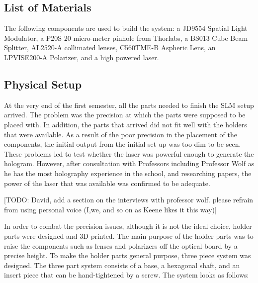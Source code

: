 \documentclass[12pt]{article}
\begin{document}
\subsection{List of Materials}
The following components are used to build the system: a JD9554 Spatial Light Modulator, a P20S 20 micro-meter pinhole from Thorlabs, a BS013 Cube Beam Splitter, AL2520-A collimated lenses, C560TME-B Aspheric Lens, an LPVISE200-A Polarizer, and a high powered laser.

\subsection{Physical Setup}
At the very end of the first semester, all the parts needed to finish the SLM setup arrived. The problem was the precision at which the parts were supposed to be placed with. In addition, the parts that arrived did not fit well with the holders that were available. As a result of the poor precision in the placement of the components, the initial output from the initial set up was too dim to be seen. These problems led to test whether the laser was powerful enough to generate the hologram. However, after consultation with Professors including Professor Wolf as he has the most holography experience in the school, and researching papers, the power of the laser that was available was confirmed to be adequate.

[TODO: David, add a section on the interviews with professor wolf. please refrain from using personal voice (I,we, and so on as Keene likes it this way)]

In order to combat the precision issues, although it is not the ideal choice, holder parts were designed and 3D printed. The main purpose of the holder parts was to raise the components such as lenses and polarizers off the optical board by a precise height. To make the holder parts general purpose, three piece system was designed. The three part system consists of a base, a hexagonal shaft, and an insert piece that can be hand-tightened by a screw. The system looks as follows:
\end{document}

